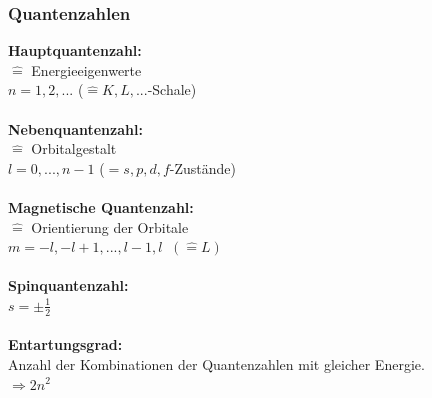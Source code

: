 \documentclass[a4paper,twocolumn,10pt]{article}
\begin{document}
\subsubsection{Quantenzahlen}
\textbf{Hauptquantenzahl:}\\
$\hat{=}$ Energieeigenwerte\\
$n=1,2,...$ ($\hat{=} K,L,...$-Schale) \\\\
\textbf{Nebenquantenzahl:}\\
$\hat{=}$ Orbitalgestalt\\
$l=0,...,n-1$ ($\hat{=} s,p,d,f$-Zustände)\\\\
\textbf{Magnetische Quantenzahl:}\\
$\hat{=}$ Orientierung der Orbitale\\
$m=-l,-l+1,...,l-1,l\;\;(\widehat{=}L)$\\\\
\textbf{Spinquantenzahl:}\\
$s=\pm \frac{1}{2}$\\\\
\textbf{Entartungsgrad:}\\
Anzahl der Kombinationen der Quantenzahlen mit gleicher Energie.\\
$\Rightarrow 2n^2$\\
\end{document}
